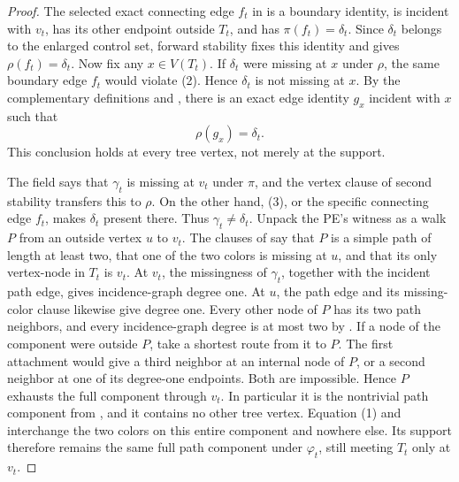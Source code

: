\begin{proof}
The selected exact connecting edge \(f_t\) in
 is a boundary identity, is incident
with \(v_t\), has its other endpoint outside \(T_t\), and has
\(\pi(f_t)=\delta_t\).  Since \(\delta_t\) belongs to the enlarged
control set, forward stability fixes this identity and gives
\(\rho(f_t)=\delta_t\).  Now fix any \(x\in V(T_t)\).  If
\(\delta_t\) were missing at \(x\) under \(\rho\), the same boundary
edge \(f_t\) would violate (2).  Hence \(\delta_t\) is not missing at
\(x\).  By the complementary definitions
 and , there is an exact
edge identity \(g_x\) incident with \(x\) such that
\[
                         \rho(g_x)=\delta_t .                    \tag{3}
\]
This conclusion holds at every tree vertex, not merely at the support.

The  field says that \(\gamma_t\) is
missing at \(v_t\) under \(\pi\), and the vertex clause of second
stability transfers this to \(\rho\).  On the other hand, (3), or the
specific connecting edge \(f_t\), makes \(\delta_t\) present there.
Thus \(\gamma_t\ne\delta_t\).  Unpack the PE's
 witness as a walk \(P\) from an outside vertex \(u\)
to \(v_t\).  The clauses of  say that \(P\) is a
simple path of length at least two, that one of the two colors is missing
at \(u\), and that its only vertex-node in \(T_t\) is \(v_t\).  At
\(v_t\), the missingness of \(\gamma_t\), together with the incident
path edge, gives incidence-graph degree one.  At \(u\), the path edge
and its missing-color clause likewise give degree one.  Every other node
of \(P\) has its two path neighbors, and every incidence-graph degree is
at most two by .  If a node of
the component were outside \(P\), take a shortest route from it to
\(P\).  The first attachment would give a third neighbor at an internal
node of \(P\), or a second neighbor at one of its degree-one endpoints.
Both are impossible.  Hence \(P\) exhausts the full component through
\(v_t\).  In particular it is the nontrivial path component from
, and it contains no other tree vertex.
Equation (1) and  interchange the two
colors on this entire component and nowhere else.  Its support therefore
remains the same full path component under \(\varphi_t\), still meeting
\(T_t\) only at \(v_t\).


\end{proof}
